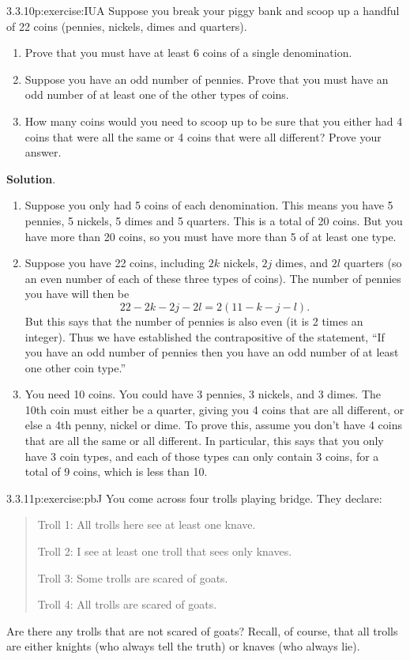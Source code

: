 \documentclass[twoside,11pt,]{book}
\newcommand{\blocktitlefont}{\relax}
\numberwithin{equation}{chapter}
\begin{document}
\begin{divisionsolution}{3.3.10}{}{p:exercise:IUA}%
Suppose you break your piggy bank and scoop up a handful of 22 coins (pennies, nickels, dimes and quarters).%
\begin{enumerate}[label=(\alph*)]
\item{}Prove that you must have at least 6 coins of a single denomination.%
\item{}Suppose you have an odd number of pennies. Prove that you must have an odd number of at least one of the other types of coins.%
\item{}How many coins would you need to scoop up to be sure that you either had 4 coins that were all the same or 4 coins that were all different? Prove your answer.%
\end{enumerate}
%
\par\smallskip%
\noindent\textbf{\blocktitlefont Solution}.\quad{}%
\begin{enumerate}[label=(\alph*)]
\item{}Suppose you only had 5 coins of each denomination. This means you have 5 pennies, 5 nickels, 5 dimes and 5 quarters. This is a total of 20 coins. But you have more than 20 coins, so you must have more than 5 of at least one type.%
\item{}Suppose you have 22 coins, including \(2k\) nickels, \(2j\) dimes, and \(2l\) quarters (so an even number of each of these three types of coins). The number of pennies you have will then be%
\begin{equation*}
22 - 2k - 2j - 2l = 2(11-k-j-l)\text{.}
\end{equation*}
But this says that the number of pennies is also even (it is 2 times an integer). Thus we have established the contrapositive of the statement, ``If you have an odd number of pennies then you have an odd number of at least one other coin type.''%
\item{}You need 10 coins. You could have 3 pennies, 3 nickels, and 3 dimes. The 10th coin must either be a quarter, giving you 4 coins that are all different, or else a 4th penny, nickel or dime. To prove this, assume you don't have 4 coins that are all the same or all different. In particular, this says that you only have 3 coin types, and each of those types can only contain 3 coins, for a total of 9 coins, which is less than 10.%
\end{enumerate}
%
\end{divisionsolution}%
\begin{divisionsolution}{3.3.11}{}{p:exercise:pbJ}%
You come across four trolls playing bridge. They declare:%
\begin{quote}%
Troll 1: All trolls here see at least one knave.%
\par
Troll 2: I see at least one troll that sees only knaves.%
\par
Troll 3: Some trolls are scared of goats.%
\par
Troll 4: All trolls are scared of goats.%
\end{quote}
Are there any trolls that are not scared of goats? Recall, of course, that all trolls are either knights (who always tell the truth) or knaves (who always lie).%
\end{divisionsolution}%
\end{document}
